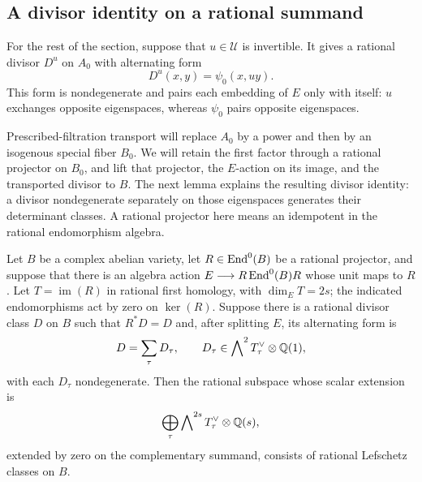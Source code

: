 \subsection{A divisor identity on a rational summand}

For the rest of the section, suppose that $u\in\mathcal U$ is
invertible.  It gives a rational divisor $D^u$ on $A_0$ with
alternating form
\begin{equation}\label{eq:weil-extra-divisor}
 D^u(x,y)=\psi_0(x,uy).
\end{equation}
This form is nondegenerate and pairs each embedding of $E$ only with
itself: $u$ exchanges opposite eigenspaces, whereas $\psi_0$ pairs
opposite eigenspaces.

Prescribed-filtration transport will replace $A_0$ by a power and
then by an isogenous special fiber $B_0$.  We will retain the first
factor through a rational projector on $B_0$, and lift that projector,
the $E$-action on its image, and the transported divisor to $B$.
The next lemma explains the resulting divisor identity: a divisor
nondegenerate separately on those eigenspaces generates their
determinant classes.  A rational projector here means an idempotent
in the rational endomorphism algebra.

\begin{lemma}\label{lem:weil-divisor-span}
Let $B$ be a complex abelian variety, let $R\in\operatorname{End}^0(B)$ be a
rational projector, and suppose that there is an algebra action
$E\longrightarrow R\operatorname{End}^0(B)R$ whose unit maps to $R$.
Let $T=\operatorname{im}(R)$ in rational first homology, with
$\dim_E T=2s$; the indicated endomorphisms act by zero on
$\ker(R)$.  Suppose there is a rational divisor class $D$ on
$B$ such that $R^*D=D$ and, after splitting $E$, its alternating form
is
\[
 D=\sum_\tau D_\tau,
 \qquad D_\tau\in\bigwedge\nolimits^2 T_\tau^\vee\otimes\mathbb Q(1),
\]
with each $D_\tau$ nondegenerate.  Then the rational subspace whose
scalar extension is
\[
 \bigoplus_\tau\bigwedge\nolimits^{2s}T_\tau^\vee\otimes\mathbb Q(s),
\]
extended by zero on the complementary summand, consists of rational
Lefschetz classes on $B$.
\end{lemma}


